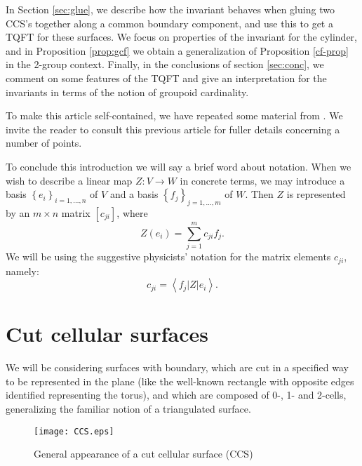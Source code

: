 \documentclass[a4paper,11pt]{article}
\begin{document}
In Section \ref{sec:glue}, we describe how the invariant behaves when gluing two CCS's together along a common boundary component, and use this to get a TQFT for these surfaces. We focus on properties of the invariant for the cylinder, and in Proposition \ref{prop:gcf} we obtain a generalization of Proposition \ref{cf-prop}  in the 2-group context. Finally, in the conclusions of section \ref{sec:conc}, we comment on some features of the TQFT and give an interpretation for the invariants in terms of the notion of groupoid cardinality.

To make this article self-contained, we have repeated some material from \cite{bp1}. We invite the reader to consult this previous article for fuller details concerning a number of points.


To conclude this introduction we will say a brief word about notation. When we wish to describe a linear map $Z: V\rightarrow W$ in concrete terms, we may introduce a basis 
$\left\{e_i\right\}_{i=1,\dots,n}$ of $V$ and a basis $\left\{f_j\right\}_{j=1,\dots,m}$ of $W$. Then $Z$ is represented by an $m\times n$ matrix 
$[c_{ji}]$, where 
$$Z(e_i) =\sum_{j=1}^m c_{ji}f_j.
$$
We will be using the suggestive physicists' notation for the matrix elements $c_{ji}$, namely:
$$
c_{ji}=  \left \langle f_j\left | Z \right | e_i  \right \rangle.
$$





\vskip 0.3cm


\section{Cut cellular surfaces}

\label{sec:ccs}

We will be considering surfaces with boundary, which are cut in a specified way to be represented in the plane (like the well-known rectangle with opposite edges identified representing the torus), and which are composed of 0-, 1- and 2-cells, generalizing the familiar notion of a triangulated surface. 

\begin{figure}[htbp]
\centering
\texttt{[image: CCS.eps]}
\caption{General appearance of a cut cellular surface (CCS)}
\label{fig:ccs}
\end{figure}
\end{document}
